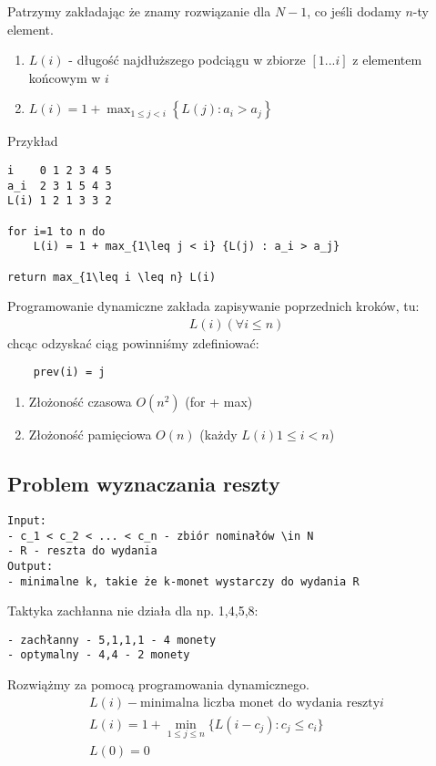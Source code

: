 \documentclass{article}
\numberwithin{equation}{subsection}
\begin{document}
Patrzymy zakładając że znamy rozwiązanie dla $N-1$, co jeśli dodamy $n$-ty element.

\begin{enumerate}
    \item $L(i)$ - długość najdłuższego podciągu w zbiorze $[1...i]$ z elementem końcowym w $i$
    \item $L(i) = 1 + \max_{1\leq j < i} \left\{L(j) : a_i > a_j\right\}$
\end{enumerate}
Przykład
\begin{verbatim}
i    0 1 2 3 4 5
a_i  2 3 1 5 4 3
L(i) 1 2 1 3 3 2

for i=1 to n do
    L(i) = 1 + max_{1\leq j < i} {L(j) : a_i > a_j}

return max_{1\leq i \leq n} L(i)
\end{verbatim}
Programowanie dynamiczne zakłada zapisywanie poprzednich kroków, tu:
\begin{align}
    L(i) \left(\forall i\leq n\right)
\end{align}
chcąc odzyskać ciąg powinniśmy zdefiniować:
\begin{verbatim}
    prev(i) = j
\end{verbatim}

\begin{enumerate}
    \item Złożoność czasowa $O(n^2)$ (for + max)
    \item Złożoność pamięciowa $O(n)$ (każdy $L(i) 1\leq i< n$)
\end{enumerate}

\subsection{Problem wyznaczania reszty}

\begin{verbatim}
Input: 
- c_1 < c_2 < ... < c_n - zbiór nominałów \in N
- R - reszta do wydania
Output:
- minimalne k, takie że k-monet wystarczy do wydania R
\end{verbatim}
Taktyka zachłanna nie działa dla np. 1,4,5,8:
\begin{verbatim}
- zachłanny - 5,1,1,1 - 4 monety
- optymalny - 4,4 - 2 monety
\end{verbatim}
Rozwiążmy za pomocą programowania dynamicznego.
\begin{align}
    L(i) - \text{minimalna liczba monet do wydania reszty} i\\
    L(i) = 1 + \min_{1\leq j \leq n} \{L(i-c_j) : c_j \leq c_i\}\\
    L(0) = 0
\end{align}
\end{document}
